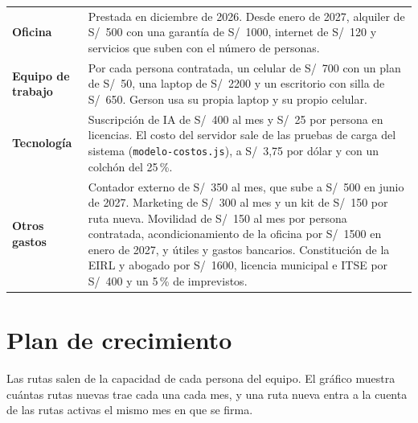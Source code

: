 \documentclass[10.5pt,a4paper]{article}
\begin{document}
{\begin{tabularx}{\linewidth}{@{}>{\bfseries}p{3.3cm}X@{}}
Oficina & Prestada en diciembre de 2026. Desde enero de 2027, alquiler de S/~500 con una garantía de S/~1000, internet de S/~120 y servicios que suben con el número de personas.\\
Equipo de trabajo & Por cada persona contratada, un celular de S/~700 con un plan de S/~50, una laptop de S/~2200 y un escritorio con silla de S/~650. Gerson usa su propia laptop y su propio celular.\\
Tecnología & Suscripción de IA de S/~400 al mes y S/~25 por persona en licencias. El costo del servidor sale de las pruebas de carga del sistema (\texttt{modelo-costos.js}), a S/~3,75 por dólar y con un colchón del 25\,\%.\\
Otros gastos & Contador externo de S/~350 al mes, que sube a S/~500 en junio de 2027. Marketing de S/~300 al mes y un kit de S/~150 por ruta nueva. Movilidad de S/~150 al mes por persona contratada, acondicionamiento de la oficina por S/~1500 en enero de 2027, y útiles y gastos bancarios. Constitución de la EIRL y abogado por S/~1600, licencia municipal e ITSE por S/~400 y un 5\,\% de imprevistos.\\
\bottomrule
\end{tabularx}}

\section{Plan de crecimiento}

Las rutas salen de la capacidad de cada persona del equipo. El gráfico muestra cuántas rutas nuevas trae cada una cada mes, y una ruta nueva entra a la cuenta de las rutas activas el mismo mes en que se firma.
\end{document}
